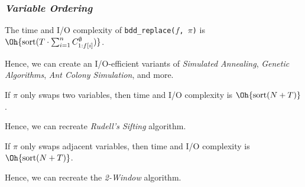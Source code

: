 \documentclass[english, aspectratio=169]{beamer}
\newcommand{\sort}[1]{\text{sort}(#1)}
\begin{document}
\begin{frame}
  \frametitle{\secname\quad \emph{Variable Ordering}}

  \begin{theorem}[S{\o}lvsten~'25]
    The time and I/O complexity of \texttt{bdd\_replace($f$, $\pi$)} is
    $\Oh{\sort{T \cdot \sum_{i=1}^n C^{\emptyset}_{1:f[i]}}}$.
  \end{theorem}
  Hence, we can create an I/O-efficient variants of \emph{Simulated Annealing},
  \emph{Genetic Algorithms}, \emph{Ant Colony Simulation}, and more.

  \pause
  \begin{theorem}[S{\o}lvsten~'25]
    If $\pi$ only swaps two variables, then time and I/O complexity is
    $\Oh{\sort{N+T}}$.
  \end{theorem}
  Hence, we can recreate \emph{Rudell's Sifting} algorithm.

  \pause
  \begin{theorem}[S{\o}lvsten~'25]
    If $\pi$ only swaps adjacent variables, then time and I/O complexity is
    $\Oh{\sort{N+T}}$.
  \end{theorem}
  Hence, we can recreate the \emph{2-Window} algorithm.

\end{frame}
\end{document}
